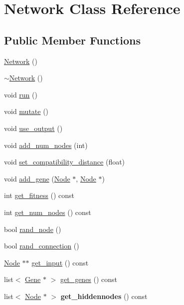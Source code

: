 \hypertarget{classNetwork}{}\section{Network Class Reference}
\label{classNetwork}
\subsection*{Public Member Functions}
\begin{DoxyCompactItemize}
\item 
\hyperlink{classNetwork_a3cc2fb4f8fa4d507077e8da85ce5a1c8}{Network} ()
\item 
\hyperlink{classNetwork_a7a4e19cdb4bf0c7ecf82baa643831492}{$\sim$\+Network} ()
\item 
void \hyperlink{classNetwork_acc13a2e54ee332bb9f288f953ae141ed}{run} ()
\item 
void \hyperlink{classNetwork_aee08409aeb49afa57118ecd46fe78860}{mutate} ()
\item 
void \hyperlink{classNetwork_a7ed4519d18b5a0ef1609c0bcb5293eac}{use\+\_\+output} ()
\item 
void \hyperlink{classNetwork_a4a5894f93aa47d4a39f3709d1f828758}{add\+\_\+num\+\_\+nodes} (int)
\item 
void \hyperlink{classNetwork_a05aacf7dc8b0a5f5ad450a8967a23bcd}{set\+\_\+compatibility\+\_\+distance} (float)
\item 
void \hyperlink{classNetwork_a3e94eace0d502e87c88bc33cac84cfc4}{add\+\_\+gene} (\hyperlink{classNode}{Node} $\ast$, \hyperlink{classNode}{Node} $\ast$)
\item 
int \hyperlink{classNetwork_a1dc09e49b864fdd2cf44530b765c924b}{get\+\_\+fitness} () const 
\item 
int \hyperlink{classNetwork_afaeeda0548935cc3da97b1978884c851}{get\+\_\+num\+\_\+nodes} () const 
\item 
bool \hyperlink{classNetwork_a29676c0b42a6123b441e7f1fcba522b4}{rand\+\_\+node} ()
\item 
bool \hyperlink{classNetwork_a5f85af3cb52fcab5b15b226496686e77}{rand\+\_\+connection} ()
\item 
\hyperlink{classNode}{Node} $\ast$$\ast$ \hyperlink{classNetwork_a40d0e94071662469e6cacafbd6f42f07}{get\+\_\+input} () const 
\item 
list$<$ \hyperlink{classGene}{Gene} $\ast$ $>$ \hyperlink{classNetwork_aa55b25f282057ae47e0de0eeea39445f}{get\+\_\+genes} () const 
\item 
list$<$ \hyperlink{classNode}{Node} $\ast$ $>$ {\bfseries get\+\_\+hiddennodes} () const \hypertarget{classNetwork_a44a5bc55c678e26d8644012a0da88a68}{}\label{classNetwork_a44a5bc55c678e26d8644012a0da88a68}

\end{DoxyCompactItemize}
